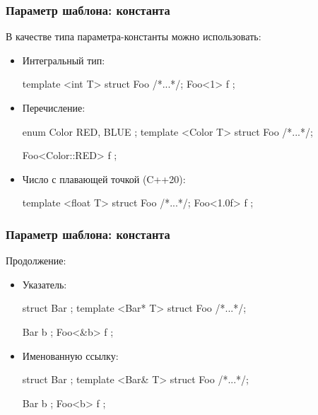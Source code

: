 \documentclass[compress, 8pt, aspectratio=169]{beamer}
\begin{document}
  \begin{frame}[fragile]

    \frametitle{Параметр шаблона: константа}

    В качестве типа параметра-константы можно использовать:

    \begin{itemize}

      \item Интегральный тип:
        \begin{myinplacelisting}[minted language=cpp]
template <int T> struct Foo {/*...*/};
Foo<1> f {};
        \end{myinplacelisting}

      \item Перечисление:
        \begin{myinplacelisting}[minted language=cpp]
enum Color { RED, BLUE };
template <Color T> struct Foo {/*...*/};

Foo<Color::RED> f {};
        \end{myinplacelisting}

      \item Число с плавающей точкой (C++20):
        \begin{myinplacelisting}[minted language=cpp]
template <float T> struct Foo {/*...*/};
Foo<1.0f> f {};
        \end{myinplacelisting}

    \end{itemize}

  \end{frame}

  \begin{frame}[fragile]

    \frametitle{Параметр шаблона: константа}

    Продолжение:
    
    \begin{itemize}

      \item Указатель:
        \begin{myinplacelisting}[minted language=cpp]
struct Bar {};
template <Bar* T> struct Foo {/*...*/};

Bar b {};
Foo<&b> f {};
        \end{myinplacelisting}

      \item Именованную ссылку:
        \begin{myinplacelisting}[minted language=cpp]
struct Bar {};
template <Bar& T> struct Foo {/*...*/};

Bar b {};
Foo<b> f {};
        \end{myinplacelisting}

    \end{itemize}

  \end{frame}
\end{document}
